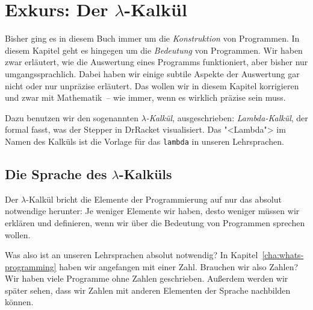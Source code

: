 
\chapter{Exkurs: Der $\lambda$-Kalkül}
\label{chap:lambda}

\newcommand{\lrm}{\mathrm}


Bisher ging es in diesem Buch immer um die \emph{Konstruktion} von
Programmen.  In diesem Kapitel geht es hingegen um die
\textit{Bedeutung} von Programmen.  Wir haben zwar erläutert, wie die
Auswertung eines Programms funktioniert, aber bisher nur
umgangssprachlich.  Dabei haben wir einige subtile Aspekte der
Auswertung gar nicht oder nur unpräzise erläutert.  Das wollen wir in
diesem Kapitel korrigieren und zwar mit Mathematik~-- wie immer, wenn
es wirklich präzise sein muss.

Dazu benutzen wir den sogenannten \textit{$\lambda$-Kalkül},
ausgeschrieben: \textit{Lambda-Kalkül}, der formal fasst, was der
Stepper in DrRacket visualisiert.  Das "<Lambda"> im Namen des Kalküls
ist die Vorlage für das \lstinline{lambda} in unseren Lehrsprachen.

\section{Die Sprache des $\lambda$-Kalküls}
\label{sec:sprache}

Der $\lambda$-Kalkül bricht die Elemente der Programmierung auf nur
das absolut notwendige herunter: Je weniger Elemente wir haben, desto
weniger müssen wir erklären und definieren, wenn wir über die
Bedeutung von Programmen sprechen wollen.

Was also ist an unseren Lehrsprachen absolut notwendig?  In
Kapitel~\ref{cha:whats-programming} haben wir angefangen mit einer
Zahl.  Brauchen wir also Zahlen?  Wir haben viele Programme ohne
Zahlen geschrieben.  Außerdem werden wir später sehen, dass wir
Zahlen mit anderen Elementen der Sprache nachbilden können.

